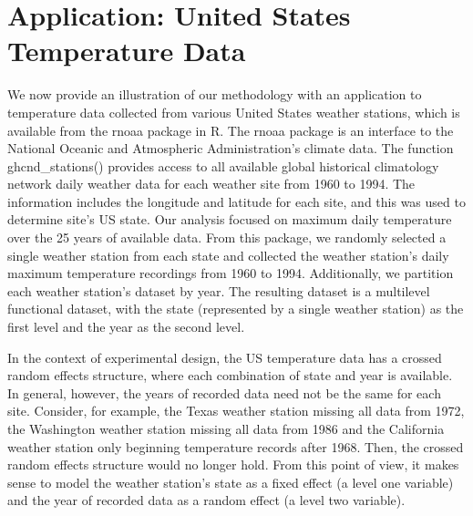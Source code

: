 \documentclass[ba]{imsart}
\numberwithin{equation}{section}
\theoremstyle{plain}
\begin{document}

\section{Application: United States Temperature Data}
\label{sec:us_weather_data}

We now provide an illustration of our methodology with an application to temperature data collected from
various United
States weather stations, which is available from the \textsf{rnoaa} package \citep{rnoaa21} in \textsf{R}.
The \textsf{rnoaa}
package is an interface to the National Oceanic and Atmospheric Administration's climate data.
The function \textsf{ghcnd\_stations()} provides access to all available global historical climatology
network daily weather data for each weather site from 1960 to 1994. The information includes the longitude
and latitude for each site, and this was used to determine site's US state.
Our analysis focused on maximum daily temperature over the 25 years of available data.
From this package, we randomly selected a single weather station from each state and collected the
weather station's daily maximum temperature recordings from 1960 to 1994.
Additionally, we partition each weather station's dataset by year.
The resulting dataset is
a multilevel functional dataset, with the state (represented by a single weather station) as the first level
and the year as the second level.

In the context of experimental design, the US temperature data
has a crossed random effects structure, where each combination of state and year is available. In general,
however, the years of recorded data need not be the same for each site. Consider, for example,
the Texas weather station missing all data from 1972, the Washington weather station missing all data
from 1986 and the California weather station only beginning temperature records after 1968. Then, the
crossed random effects structure would no longer hold. From this point of view, it makes sense to model
the weather station's state as a fixed effect (a level one variable) and the year of recorded data as a random
effect (a level two variable).
\end{document}
